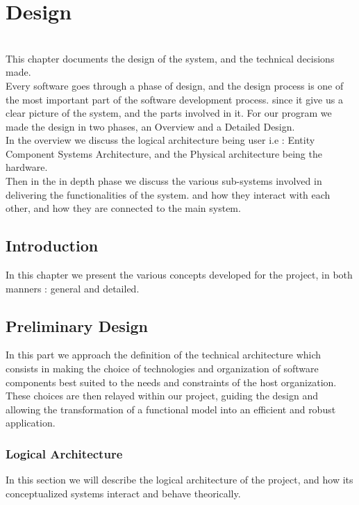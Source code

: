 \chapter{Design}%
\label{chap:chapter_three}
\vspace{25pt} {
  \hrulefill \\%
  This chapter documents the design of the system, and the technical decisions made.\\%
  Every software goes through a phase of design, and the design process is one of the most important 
  part of the software development process. since it give us a clear picture of the system, and the
  parts involved in it.
  For our program we made the design in two phases, an Overview and a Detailed Design.\\%
  In the overview we discuss the logical architecture being user i.e : Entity Component Systems Architecture,
  and the Physical architecture being the hardware.\\%
  Then in the in depth phase we discuss the various sub-systems involved in delivering the functionalities of the system.
  and how they interact with each other, and how they are connected to the main system.
  \hrulefill\\
}
\pagebreak
\section{\textnormal{Introduction}}
\label{chap:section_one}
    In this chapter we present the various concepts developed for the project, in both manners : general and detailed.
\section{\textnormal{Preliminary Design}}
\label{chap:section_one}
  In this part we approach the definition of the technical architecture which consists in making the
  choice of technologies and organization of software components best suited to the needs and
  constraints of the host organization. These choices are then relayed within our project,
  guiding the design and allowing the transformation of a functional model into an efficient and robust application.  
  \subsection{Logical Architecture}
  In this section we will describe the logical architecture of the project, and how its conceptualized systems interact and behave theorically.
